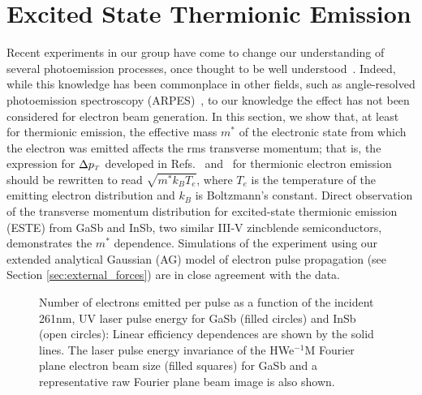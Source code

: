 
\section{Excited State Thermionic Emission} \label{sec:este}

Recent experiments in our group have come to change our understanding of several photoemission processes, once thought to be well understood~\cite{berger_excited_2012}.
Indeed, while this knowledge has been commonplace in other fields, such as angle-resolved photoemission spectroscopy (ARPES)~\cite{himpsel_angle-resolved_1983}, to our knowledge the effect has not been considered for electron beam generation.
In this section, we show that, at least for thermionic emission, the effective mass $m^*$ of the electronic state from which the electron was emitted affects the rms transverse momentum; that is, the expression for $\Delta p_{{\scriptscriptstyle T}}$ developed in Refs.~\cite{dowell_quantum_2009} and~\cite{jensen_emittance_2010} for thermionic electron emission should be rewritten to read $\sqrt{m^* k_B T_e}$, where $T_e$ is the temperature of the emitting electron distribution and $k_B$ is Boltzmann's constant.
Direct observation of the transverse momentum distribution for excited-state thermionic emission (ESTE) from GaSb and InSb, two similar III-V zincblende semiconductors, demonstrates the $m^*$ dependence.
Simulations of the experiment using our extended analytical Gaussian (AG) model of electron pulse propagation (see Section \ref{sec:external_forces}) are in close agreement with the data. 

\begin{figure}
  \centering
  
  \caption[Electron emission vs UV laser pulse energy for GaSb and InSb]{
    Number of electrons emitted per pulse as a function of the incident 261nm, UV laser pulse energy for GaSb (filled circles) and InSb (open circles): Linear efficiency dependences are shown by the solid lines.
    The laser pulse energy invariance of the HWe$^{-1}$M Fourier plane electron beam size (filled squares) for GaSb and a representative raw Fourier plane beam image is also shown.
  }
  \label{fig:este-semicond}
\end{figure}


